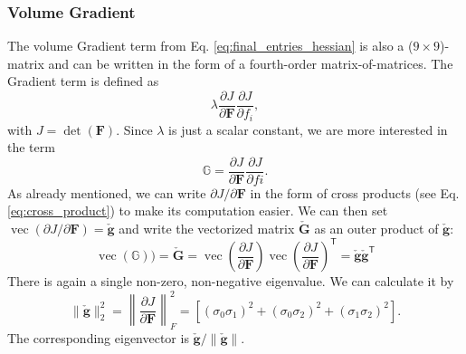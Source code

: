 {{{\subsubsection{Volume Gradient}
The volume Gradient term from Eq. \eqref{eq:final_entries_hessian} is also a ($9 \times 9$)-matrix and can be written in the form of a fourth-order matrix-of-matrices. The Gradient term is defined as
\[
	\lambda \frac{\partial J}{\partial \mathbf{F}} \frac{\partial J}{\partial f_i},
\]
with $J=\operatorname{det}(\mathbf{F})$. Since $\lambda$ is just a scalar constant, we are more interested in the term 
\[
\mathbb{G} = \frac{\partial J}{\partial \mathbf{F}} \frac{\partial J}{\partial fi}.
\]
As already mentioned, we can write $\partial J / \partial \mathbf{F}$ in the form of cross products (see Eq. \eqref{eq:cross_product}) to make its computation easier. We can then set $\operatorname{vec}(\partial J / \partial \mathbf{F}) = \mathbf{\check{g}}$ and write the vectorized matrix $\mathbf{\check{G}}$ as an outer product of $\mathbf{\check{g}}$:
\[
\operatorname{vec}(\mathbb{G})) = \mathbf{\check{G}} = \operatorname{vec}\left(\frac{\partial J}{\partial \mathbf{F}}\right) \operatorname{vec}\left(\frac{\partial J}{\partial \mathbf{F}}\right)^\mathsf{T} = \mathbf{\check{g}} \mathbf{\check{g}}^\mathsf{T}
\]
There is again a single non-zero, non-negative eigenvalue. We can calculate it by
\[
\| \mathbf{\check{g}} \|^2_2 = \left\| \frac{\partial J}{\partial \mathbf{F}} \right \|^2_F = \left[ (\sigma_0 \sigma_1)^2 + (\sigma_0 \sigma_2)^2 + (\sigma_1 \sigma_2)^2 \right].
\]
The corresponding eigenvector is $\mathbf{\check{g}} / \| \mathbf{\check{g}} \|$.

}}}
